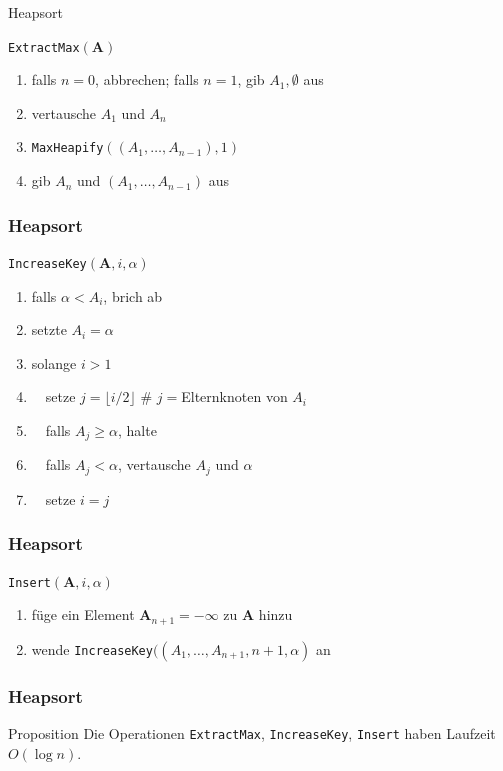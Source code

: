 \documentclass[aspectratio=1610, 11pt]{beamer}
\renewcommand{\vec}[1]{\boldsymbol{#1}}
\newcommand\vA{\vec A}
\begin{document}
\begin{frame}{Heapsort}
	\begin{exampleblock}{\tt ExtractMax$(\vA)$}
		\begin{enumerate}
			\item falls $n=0$, abbrechen; falls $n=1$, gib $A_1,\emptyset$ aus
			\item vertausche $A_1$ und $A_n$
			\item {\tt MaxHeapify}$((A_1,\ldots,A_{n-1}),1)$
			\item gib $A_n$ und $(A_1,\ldots,A_{n-1})$ aus
		\end{enumerate}
	\end{exampleblock}
\end{frame}

\begin{frame}\frametitle{Heapsort}
	\begin{exampleblock}{\tt IncreaseKey$(\vA,i,\alpha)$}
		\begin{enumerate}
			\item falls $\alpha<A_i$, brich ab
			\item setzte $A_i=\alpha$
			\item solange $i>1$
			\item $\quad$setze $j=\lfloor i/2\rfloor$ \hfill\# $j=$Elternknoten von $A_i$
			\item $\quad$falls $A_j\geq\alpha$, halte
			\item $\quad$falls $A_j<\alpha$, vertausche $A_j$ und $\alpha$
			\item $\quad$setze $i=j$
		\end{enumerate}
	\end{exampleblock}
\end{frame}

\begin{frame}\frametitle{Heapsort}
	\begin{exampleblock}{\tt Insert$(\vA,i,\alpha)$}
		\begin{enumerate}
			\item f\"uge ein Element $\vA_{n+1}=-\infty$ zu $\vA$ hinzu
			\item wende {\tt IncreaseKey}$((A_1,\ldots,A_{n+1},n+1,\alpha)$ an
		\end{enumerate}
	\end{exampleblock}
\end{frame}

\begin{frame}\frametitle{Heapsort}
	\begin{block}{Proposition}
		Die Operationen {\tt ExtractMax}, {\tt IncreaseKey}, {\tt Insert} haben Laufzeit $O(\log n)$.
	\end{block}
\end{frame}
\end{document}
